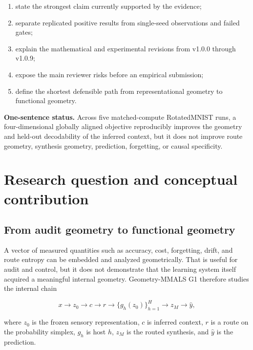 \documentclass[11pt,a4paper]{article}
\begin{document}
\begin{enumerate}
\item state the strongest claim currently supported by the evidence;
\item separate replicated positive results from single-seed observations and failed gates;
\item explain the mathematical and experimental revisions from v1.0.0 through v1.0.9;
\item expose the main reviewer risks before an empirical submission;
\item define the shortest defensible path from representational geometry to functional geometry.
\end{enumerate}

\begin{summarybox}
\textbf{One-sentence status.} Across five matched-compute RotatedMNIST runs, a four-dimensional globally aligned objective reproducibly improves the geometry and held-out decodability of the inferred context, but it does not improve route geometry, synthesis geometry, prediction, forgetting, or causal specificity.
\end{summarybox}

\section{Research question and conceptual contribution}

\subsection{From audit geometry to functional geometry}

A vector of measured quantities such as accuracy, cost, forgetting, drift, and route entropy can be embedded and analyzed geometrically. That is useful for audit and control, but it does not demonstrate that the learning system itself acquired a meaningful internal geometry. Geometry-MMALS G1 therefore studies the internal chain

\begin{equation}
 x \longrightarrow z_0 \longrightarrow c \longrightarrow r
 \longrightarrow \{g_h(z_0)\}_{h=1}^{H}
 \longrightarrow z_M \longrightarrow \hat y,
\end{equation}

where $z_0$ is the frozen sensory representation, $c$ is inferred context, $r$ is a route on the probability simplex, $g_h$ is host $h$, $z_M$ is the routed synthesis, and $\hat y$ is the prediction.
\end{document}
